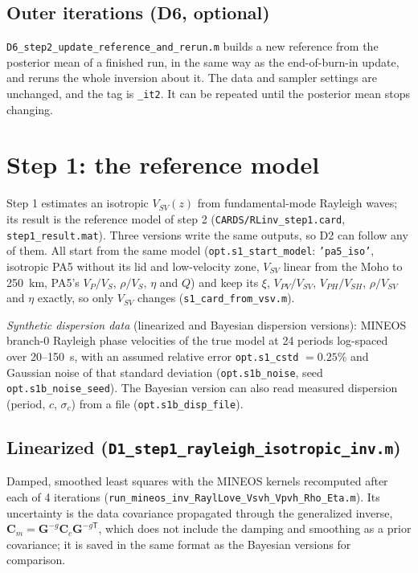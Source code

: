 \documentclass[11pt]{article}
\newcommand{\T}{\mathsf{T}}
\newcommand{\vsv}{V_{SV}}
\newcommand{\vsh}{V_{SH}}
\newcommand{\vpv}{V_{PV}}
\newcommand{\vph}{V_{PH}}
\begin{document}
\subsection{Outer iterations (D6, optional)}
\texttt{D6\_step2\_update\_reference\_and\_rerun.m} builds a new reference
from the posterior mean of a finished run, in the same way as the
end-of-burn-in update, and reruns the whole inversion about it. The data
and sampler settings are unchanged, and the tag is \texttt{\_it2}. It can
be repeated until the posterior mean stops changing.

\section{Step 1: the reference model}\label{sec:step1}

Step 1 estimates an isotropic $\vsv(z)$ from fundamental-mode Rayleigh
waves; its result is the reference model of step 2
(\texttt{CARDS/RLinv\_step1.card}, \texttt{step1\_result.mat}). Three
versions write the same outputs, so D2 can follow any of them. All start
from the same model (\texttt{opt.s1\_start\_model}: \texttt{'pa5\_iso'},
isotropic PA5 without its lid and low-velocity zone, $\vsv$ linear from the
Moho to 250~km, PA5's $V_P/V_S$, $\rho/V_S$, $\eta$ and $Q$) and keep its $\xi$, $\vpv/\vsv$, $\vph/\vsh$, $\rho/\vsv$ and $\eta$
exactly, so only $\vsv$ changes (\texttt{s1\_card\_from\_vsv.m}).

\emph{Synthetic dispersion data} (linearized and Bayesian dispersion
versions): MINEOS branch-0 Rayleigh phase velocities of the true model at
24 periods log-spaced over 20--150~s, with an assumed relative error
\texttt{opt.s1\_cstd} $=0.25\%$ and Gaussian noise of that standard
deviation (\texttt{opt.s1b\_noise}, seed \texttt{opt.s1b\_noise\_seed}).
The Bayesian version can also read measured dispersion (period, $c$,
$\sigma_c$) from a file (\texttt{opt.s1b\_disp\_file}).

\subsection{Linearized (\texttt{D1\_step1\_rayleigh\_isotropic\_inv.m})}
Damped, smoothed least squares with the MINEOS kernels recomputed after
each of 4 iterations (\texttt{run\_mineos\_inv\_RaylLove\_Vsvh\_Vpvh\_Rho\_Eta.m}).
Its uncertainty is the data covariance propagated through the generalized
inverse, $\mathbf{C}_m=\mathbf{G}^{-g}\mathbf{C}_c\mathbf{G}^{-g\T}$, which
does not include the damping and smoothing as a prior covariance; it is
saved in the same format as the Bayesian versions for comparison.
\end{document}
